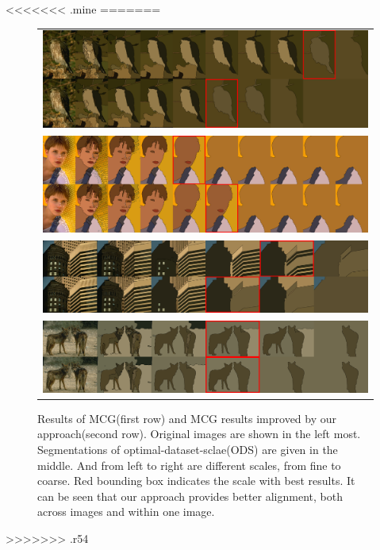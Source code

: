 <<<<<<< .mine
=======
\begin{figure}
\begin{center}
\begin{tabular}{c}
\includegraphics[width=17cm]{fig/vis/70090.png} \\
\includegraphics[width=17cm]{fig/vis/388006.png} \\
\includegraphics[width=17cm]{fig/vis/48017.png} \\
\includegraphics[width=17cm]{fig/vis/196062.png}
\end{tabular}
\end{center}
\caption{Results of MCG(first row) and MCG results improved by our approach(second row). Original images are shown in the left most. Segmentations of optimal-dataset-sclae(ODS) are given in the middle. And from left to right are different scales, from fine to coarse. Red bounding box indicates the scale with best results. It can be seen that our approach provides better alignment, both across images and within one image. }
\label{fig:mcgnimprov}
\end{figure}
>>>>>>> .r54

